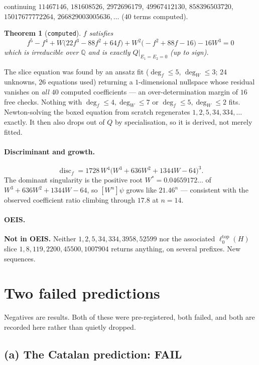 \documentclass[11pt,a4paper]{article}
\newcommand{\ltop}{\ell^{\mathrm{top}}}
\newcommand{\Q}{\mathbb{Q}}
\DeclareMathOperator{\disc}{disc}
\theoremstyle{plain}
\newtheorem{theorem}{Theorem}
\theoremstyle{definition}
\begin{document}
\noindent continuing $11467146$, $181608526$, $2972696179$, $49967412130$,
$858396503720$, $15017677772264$, $266829003005636,\dots$ ($40$ terms computed).

\begin{theorem}[\texttt{computed}]
\label{thm:slice}
$f$ satisfies
\[
\boxed{\ f^5-f^4+W\bigl(22f^3-88f^2+64f\bigr)+W^2\bigl(-f^2+88f-16\bigr)-16W^3=0\ }
\]
which is irreducible over $\Q$ and is exactly $Q|_{E_1=E_2=0}$ (up to sign).
\end{theorem}

The slice equation was found by an ansatz fit ($\deg_f\le5$, $\deg_W\le3$; $24$ unknowns,
$26$ equations used) returning a $1$-dimensional nullspace whose residual vanishes on
\emph{all $40$} computed coefficients --- an over-determination margin of $16$ free checks.
Nothing with $\deg_f\le4,\deg_W\le7$ or $\deg_f\le5,\deg_W\le2$ fits. Newton-solving the
boxed equation from scratch regenerates $1,2,5,34,334,\dots$ exactly. It then also drops out
of $Q$ by specialisation, so it is derived, not merely fitted.

\paragraph{Discriminant and growth.}
\[
\disc_f = 1728\,W^4\bigl(W^3+636W^2+1344W-64\bigr)^3 .
\]
The dominant singularity is the positive root $W^*=0.04659172\ldots$ of
$W^3+636W^2+1344W-64$, so $[W^n]\psi$ grows like $21.46^n$ --- consistent with the observed
coefficient ratio climbing through $17.8$ at $n=14$.

\paragraph{OEIS.} \textbf{Not in OEIS.} Neither $1,2,5,34,334,3958,52599$ nor the associated
$\ltop_0(H)$ slice $1,8,119,2200,45500,1007904$ returns anything, on several prefixes.
New sequences.

\section{Two failed predictions}
\label{sec:failures}

Negatives are results. Both of these were pre-registered, both failed, and both are recorded
here rather than quietly dropped.

\subsection{(a) The Catalan prediction: \textbf{FAIL}}
\end{document}
